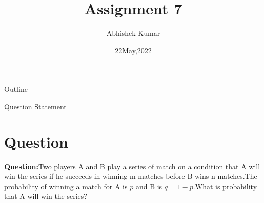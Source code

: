 \documentclass{beamer}
\title{Assignment 7}
\author{Abhishek Kumar}
\institute{IIT Hyderabad}
\date{22May,2022}
\begin{document}
\begin{frame}
		\titlepage
	\end{frame}
	\begin{frame}{Outline}
		\tableofcontents
	\end{frame}
\begin{frame}{Question Statement}
\section{Question}
\textbf{Question:}Two players A and B play a series of match on a condition that A will win the series if he succeeds in winning m matches before B wins n matches.The probability of winning a match for A is $p$ and B is $q=1-p$.What is probability that A will win the series?
\end{frame}
\end{document}
